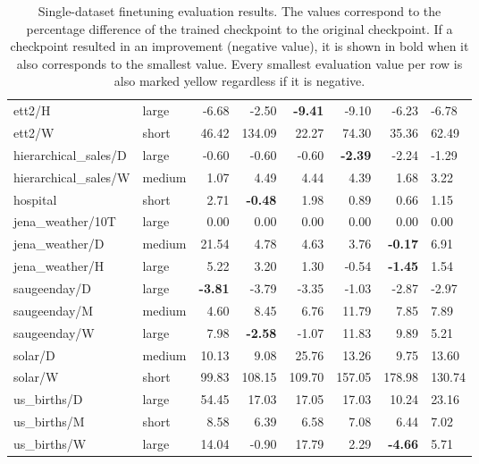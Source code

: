 \begin{table}[H]
{\begin{tabular}{l l r r r r r l}
ett2/H                & large  & -6.68 & -2.50 & \cellcolor{yellow}\textbf{-9.41} & -9.10 & -6.23 & -6.78 \\
ett2/W                & short  & 46.42 & 134.09 & \cellcolor{yellow}22.27 & 74.30 & 35.36 & 62.49 \\
hierarchical\_sales/D & large  & -0.60 & -0.60 & -0.60 & \cellcolor{yellow}\textbf{-2.39} & -2.24 & -1.29 \\
hierarchical\_sales/W & medium & \cellcolor{yellow}1.07 & 4.49 & 4.44 & 4.39 & 1.68 & 3.22 \\
hospital              & short  & 2.71 & \cellcolor{yellow}\textbf{-0.48} & 1.98 & 0.89 & 0.66 & 1.15 \\
jena\_weather/10T     & large  & 0.00 & 0.00 & 0.00 & 0.00 & 0.00 & 0.00 \\
jena\_weather/D       & medium & 21.54 & 4.78 & 4.63 & 3.76 & \cellcolor{yellow}\textbf{-0.17} & 6.91 \\
jena\_weather/H       & large  & 5.22 & 3.20 & 1.30 & -0.54 & \cellcolor{yellow}\textbf{-1.45} & 1.54 \\
saugeenday/D          & large  & \cellcolor{yellow}\textbf{-3.81} & -3.79 & -3.35 & -1.03 & -2.87 & -2.97 \\
saugeenday/M          & medium & \cellcolor{yellow}4.60 & 8.45 & 6.76 & 11.79 & 7.85 & 7.89 \\
saugeenday/W          & large  & 7.98 & \cellcolor{yellow}\textbf{-2.58} & -1.07 & 11.83 & 9.89 & 5.21 \\
solar/D               & medium & 10.13 & \cellcolor{yellow}9.08 & 25.76 & 13.26 & 9.75 & 13.60 \\
solar/W               & short  & \cellcolor{yellow}99.83 & 108.15 & 109.70 & 157.05 & 178.98 & 130.74 \\
us\_births/D          & large  & 54.45 & 17.03 & 17.05 & 17.03 & \cellcolor{yellow}10.24 & 23.16 \\
us\_births/M          & short  & 8.58 & \cellcolor{yellow}6.39 & 6.58 & 7.08 & 6.44 & 7.02 \\
us\_births/W          & large  & 14.04 & -0.90 & 17.79 & 2.29 & \cellcolor{yellow}\textbf{-4.66} & 5.71 \\
\hline
\end{tabular}
}
\caption{Single-dataset finetuning evaluation results. The values correspond to the percentage difference of the trained checkpoint to the original checkpoint. If a checkpoint resulted in an improvement (negative value), it is shown in bold when it also corresponds to the smallest value. Every smallest evaluation value per row is also marked yellow regardless if it is negative. }
\label{tab:single_finetune_wide}
\end{table}

